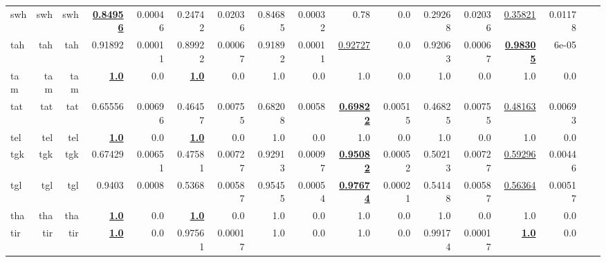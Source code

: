 \documentclass[11pt]{article}
\begin{document}
\begin{table*}[h]
{\begin{tabular}{lrrrrrrrrrrrrrrrr}
swh         & swh         & swh         & \textbf{\underline{0.84956}}         & 0.00046         & 0.24742         & 0.02036         & 0.84685         & 0.00032         & 0.78         & 0.0         & 0.29268         & 0.02036         & \underline{0.35821}         & 0.01178         \\
tah         & tah         & tah         & 0.91892         & 0.00011         & 0.89922         & 0.00067         & 0.91892         & 0.00011         & \underline{0.92727}         & 0.0         & 0.92063         & 0.00067         & \textbf{\underline{0.98305}}         & 6e-05         \\
tam         & tam         & tam         & \textbf{\underline{1.0}}         & 0.0         & \textbf{\underline{1.0}}         & 0.0         & 1.0         & 0.0         & 1.0         & 0.0         & 1.0         & 0.0         & 1.0         & 0.0         \\
tat         & tat         & tat         & 0.65556         & 0.00696         & 0.46457         & 0.00755         & 0.68208         & 0.0058         & \textbf{\underline{0.69822}}         & 0.00515         & 0.46825         & 0.00755         & \underline{0.48163}         & 0.00693         \\
tel         & tel         & tel         & \textbf{\underline{1.0}}         & 0.0         & \textbf{\underline{1.0}}         & 0.0         & 1.0         & 0.0         & 1.0         & 0.0         & 1.0         & 0.0         & 1.0         & 0.0         \\
tgk         & tgk         & tgk         & 0.67429         & 0.00651         & 0.47581         & 0.00727         & 0.92913         & 0.00097         & \textbf{\underline{0.95082}}         & 0.00052         & 0.50213         & 0.00727         & \underline{0.59296}         & 0.00446         \\
tgl         & tgl         & tgl         & 0.9403         & 0.0008         & 0.5368         & 0.00587         & 0.95455         & 0.00054         & \textbf{\underline{0.97674}}         & 0.00021         & 0.54148         & 0.00587         & \underline{0.56364}         & 0.00517         \\
tha         & tha         & tha         & \textbf{\underline{1.0}}         & 0.0         & \textbf{\underline{1.0}}         & 0.0         & 1.0         & 0.0         & 1.0         & 0.0         & 1.0         & 0.0         & 1.0         & 0.0         \\
tir         & tir         & tir         & \textbf{\underline{1.0}}         & 0.0         & 0.97561         & 0.00017         & 1.0         & 0.0         & 1.0         & 0.0         & 0.99174         & 0.00017         & \textbf{\underline{1.0}}         & 0.0         \\

\end{tabular}}
\end{table*}
\end{document}

